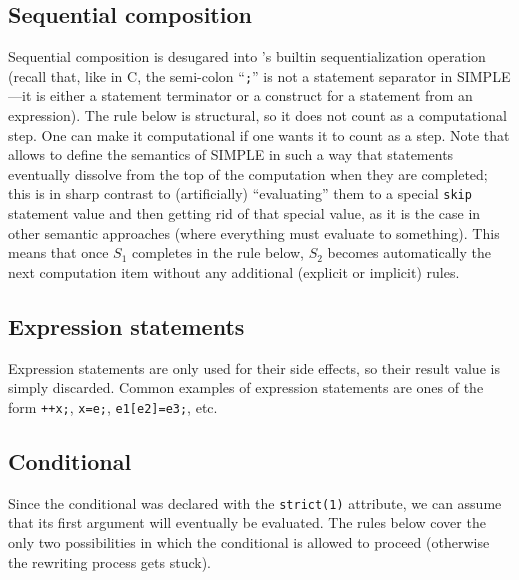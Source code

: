 \documentclass{article}
\begin{document}
\begin{kdefinition}
\begin{module}{}
\begin{kblock}[text]
 \subsection{Sequential composition}
Sequential composition is desugared into \K's builtin sequentialization
operation (recall that, like in C, the semi-colon ``\texttt{;}'' is not a
statement separator in SIMPLE---it is either a statement terminator or a
construct for a statement from an expression).  The rule below is
structural, so it does not count as a computational step.  One can make it
computational if one wants it to count as a step.  Note that \K allows
to define the semantics of SIMPLE in such a way that statements eventually
dissolve from the top of the computation when they are completed; this is in
sharp contrast to (artificially) ``evaluating'' them to a special
\texttt{skip} statement value and then getting rid of that special value, as
it is the case in other semantic approaches (where everything must evaluate
to something).  This means that once $S_1$ completes in the rule below, $S_2$
becomes automatically the next computation item without any additional
(explicit or implicit) rules. \end{kblock}
\begin{kblock}[text]
 \subsection{Expression statements}
Expression statements are only used for their side effects, so their result
value is simply discarded.  Common examples of expression statements are ones
of the form \texttt{++x;}, \texttt{x=e;}, \texttt{e1[e2]=e3;}, etc. \end{kblock}
\begin{kblock}[text]
 \subsection{Conditional}
Since the conditional was declared with the \texttt{strict(1)} attribute, we
can assume that its first argument will eventually be evaluated.  The rules
below cover the only two possibilities in which the conditional is allowed to
proceed (otherwise the rewriting process gets stuck). \end{kblock}
\begin{kblock}[text]

\end{kblock}
\end{module}
\end{kdefinition}
\end{document}
